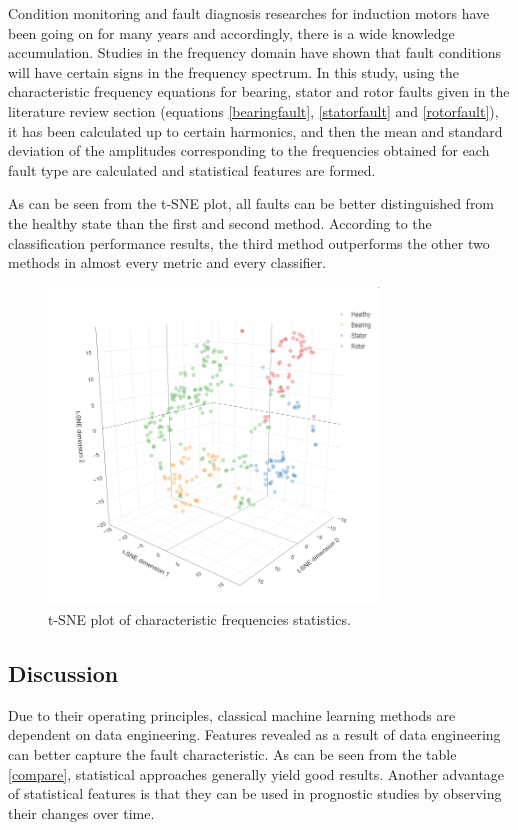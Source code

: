 Condition monitoring and fault diagnosis researches for induction motors have been going on for many years and accordingly, there is a wide knowledge accumulation. Studies in the frequency domain have shown that fault conditions will have certain signs in the frequency spectrum. In this study, using the characteristic frequency equations for bearing, stator and rotor faults given in the literature review section (equations \ref{bearingfault}, \ref{statorfault} and \ref{rotorfault}), it has been calculated up to certain harmonics, and then the mean and standard deviation of the amplitudes corresponding to the frequencies obtained for each fault type are calculated and statistical features are formed.

As can be seen from the t-SNE plot, all faults can be better distinguished from the healthy state than the first and second method. According to the classification performance results, the third method outperforms the other two methods in almost every metric and every classifier.

\begin{figure}[h]
	\centering
	\includegraphics[width=250pt,keepaspectratio=true]{./fig/sne_mcsa.PNG}
	\caption{t-SNE plot of characteristic frequencies statistics.}	
	\label{snem}
\end{figure}






\subsection{Discussion}

Due to their operating principles, classical machine learning methods are dependent on data engineering. Features revealed as a result of data engineering can better capture the fault characteristic. As can be seen from the table \ref{compare}, statistical approaches generally yield good results. Another advantage of statistical features is that they can be used in prognostic studies by observing their changes over time. 

